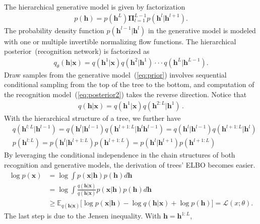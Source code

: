\documentclass[twoside]{article}
\begin{document}
The hierarchical generative model is given by factorization
\begin{align}\label{eq:prior}
p(\mathbf{h}) =  p( \mathbf{h}^{L})\mathbf{\Pi}_{l=1}^{L-1}p(\mathbf{h}^{l} | \mathbf{h}^{l+1}) .
\end{align}
The probability density function $p(\mathbf{h}^{l-1} | \mathbf{h}^{l})$ in the generative model is modeled with one or multiple invertible normalizing flow functions. The hierarchical posterior~(recognition network) is factorized as
\begin{align}\label{eq:posterior2}
q_{\theta}(\mathbf{h}| \mathbf{x}) =  q(\mathbf{h}^1 | \mathbf{x})  q(\mathbf{h}^2 | \mathbf{h}^1) \cdot \cdot  \cdot  q(\mathbf{h}^{L} | \mathbf{h}^{L-1}).
\end{align}
Draw samples from the generative model~(\ref{eq:prior})
involves sequential conditional sampling from the top of the tree to the bottom, and computation of the recognition model~(\ref{eq:posterior2}) takes the reverse direction. Notice that
\begin{align*} %
q(\mathbf{h}| \mathbf{x}) = q(\mathbf{h}^1 | \mathbf{x})  q(\mathbf{h}^{2:L} | \mathbf{h}^1) \, .
\end{align*}
With the hierarchical structure of a tree, we further have
\begin{align} \label{eq:chain_post}
&q(\mathbf{h}^{l:L}|\mathbf{h}^{l-1}) = q(\mathbf{h}^{l}|\mathbf{h}^{l-1}) q(\mathbf{h}^{l+1:L}|\mathbf{h}^{l}\mathbf{h}^{l-1})=q(\mathbf{h}^{l}|\mathbf{h}^{l-1}) q(\mathbf{h}^{l+1:L}|\mathbf{h}^{l})  \\ \label{eq:chain_prior}
& p(\mathbf{h}^{l:L})=  p(\mathbf{h}^{l}|\mathbf{h}^{l+1:L})p(\mathbf{h}^{l+1:L})=p(\mathbf{h}^{l}|\mathbf{h}^{l+1})p(\mathbf{h}^{l+1:L})
\end{align}
By leveraging  the conditional independence  in the chain structures of both recognition and generative models, the derivation of trees' ELBO becomes easier.
\begin{align*}
\log p(\mathbf{x}) &= \log \int p(\mathbf{x}|\mathbf{h})p(\mathbf{h}) d \mathbf{h} \\
&= \log \int \frac{q(\mathbf{h}|\mathbf{x})}{q(\mathbf{h}|\mathbf{x})} p(\mathbf{x}|\mathbf{h})p(\mathbf{h}) d \mathbf{h} \\
& \geqslant \mathbb{E}_{q(\mathbf{h}|\mathbf{x})}\big[ \log p(\mathbf{x}|\mathbf{h}) -  \log q(\mathbf{h}|\mathbf{x}) +  \log p(\mathbf{h}) \big] = \mathcal{L}(x; \theta).
\end{align*}
The last step is due to the Jensen inequality. With $\mathbf{h} =\mathbf{h}^{1:L} $, 
\end{document}
